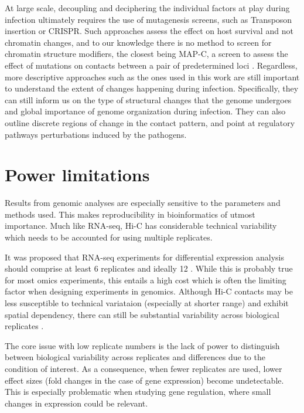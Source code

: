 At large scale, decoupling and deciphering the individual factors at play during infection ultimately requires the use of mutagenesis screens, such as Transposon insertion or CRISPR. Such approaches assess the effect on host survival and not chromatin changes, and to our knowledge there is no method to screen for chromatin structure modifiers, the closest being MAP-C, a screen to assess the effect of mutations on contacts between a pair of predetermined loci \cite{kimCombinationTranscriptionFactors2019}. Regardless, more descriptive approaches such as the ones used in this work are still important to understand the extent of changes happening during infection. Specifically, they can still inform us on the type of structural changes that the genome undergoes and global importance of genome organization during infection. They can also outline discrete regions of change in the contact pattern, and point at regulatory pathways perturbations induced by the pathogens.

\section{Power limitations}
Results from genomic analyses are especially sensitive to the parameters and methods used. This makes reproducibility in bioinformatics of utmost importance. Much like RNA-seq, Hi-C has considerable technical variability which needs to be accounted for using multiple replicates.

It was proposed that RNA-seq experiments for differential expression analysis should comprise at least 6 replicates and ideally 12 \cite{schurchHowManyBiological2016}. While this is probably true for most omics experiments, this entails a high cost which is often the limiting factor when designing experiments in genomics. Although Hi-C contacts may be less susceptible to technical variataion (especially at shorter range) and exhibit spatial dependency, there can still be substantial variability across biological replicates \cite{yangHiCRepAssessingReproducibility2017}.

The core issue with low replicate numbers is the lack of power to distinguish between biological variability across replicates and differences due to the condition of interest. As a consequence, when fewer replicates are used, lower effect sizes (fold changes in the case of gene expression) become undetectable. This is especially problematic when studying gene regulation, where small changes in expression could be relevant.

